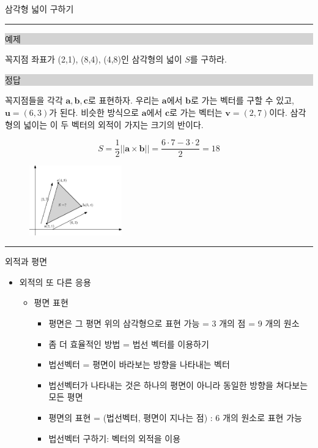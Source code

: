 \documentclass{beamer}
\begin{document}
\begin{frame}{삼각형 넓이 구하기}

\hrule
\noindent \colorbox{lightgray}{\begin{minipage}{6cm}예제\end{minipage}} 

\noindent 꼭지점 좌표가 (2,1), (8,4), (4,8)인 삼각형의 넓이 $S$를 구하라.

\noindent \colorbox{lightgray}{\begin{minipage}{6cm}정답\end{minipage}} 

{\small 꼭지점들을 각각 $\mathbf a, \mathbf b, \mathbf c$로 표현하자.
우리는 $\mathbf a$에서 $\mathbf b$로 가는 벡터를 구할 수 있고, $\mathbf u = (6,3)$가 된다.
비슷한 방식으로 $\mathbf a$에서 $\mathbf c$로 가는 벡터는 $\mathbf v = (2,7)$이다.
삼각형의 넓이는 이 두 벡터의 외적이 가지는 크기의 반이다.}

$$S = \frac{1}{2} ||\mathbf a \times \mathbf b || = \frac{6 \cdot 7 - 3 \cdot 2}{2} = 18$$

\begin{figure}
    \includegraphics[width=4cm]{Math_vector/triangleArea.eps}
\end{figure}

\hrule

\end{frame}

\begin{frame}{외적과 평면}

\begin{itemize}
\item 외적의 또 다른 응용
	\begin{itemize}
	\item 평면 표현
		\begin{itemize}
		\item 평면은 그 평면 위의 삼각형으로 표현 가능 = 3 개의 점 = 9 개의 원소
		\item 좀 더 효율적인 방법 = 법선 벡터를 이용하기
		\item 법선벡터 = 평면이 바라보는 방향을 나타내는 벡터
		\item 법선벡터가 나타내는 것은 하나의 평면이 아니라 동일한 방향을 쳐다보는 모든 평면
		\item 평면의 표현 = (법선벡터, 평면이 지나는 점) : 6 개의 원소로 표현 가능
		\item 법선벡터 구하기: 벡터의 외적을 이용
		\end{itemize}
	\end{itemize}
\end{itemize}

\end{frame}
\end{document}
